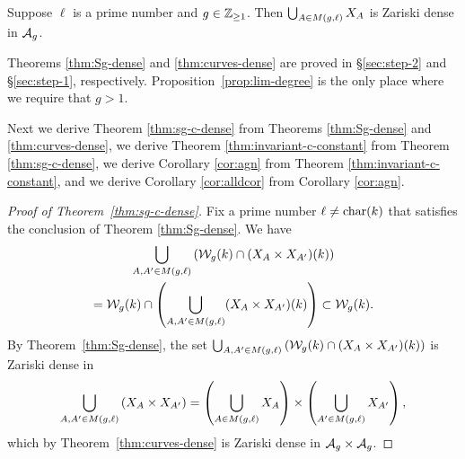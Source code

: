 \documentclass{amsart}
\begin{document}
\begin{theorem}\label{thm:curves-dense}
    Suppose $\ell$ is a prime number and $g\in\mathbb{Z}_{\ge 1}$. Then $\bigcup_{A \in M(g,\ell)} X_A$ is Zariski dense in $\mathcal{A}_g$.
\end{theorem}

Theorems \ref{thm:Sg-dense} and \ref{thm:curves-dense} are proved in \S\ref{sec:step-2} and \S\ref{sec:step-1}, respectively. Proposition~\ref{prop:lim-degree} is the only place where we require that $g > 1$.

Next we derive Theorem \ref{thm:sg-c-dense} from Theorems \ref{thm:Sg-dense} and \ref{thm:curves-dense},  we derive Theorem \ref{thm:invariant-c-constant} from Theorem \ref{thm:sg-c-dense},  we derive Corollary \ref{cor:agn} from Theorem \ref{thm:invariant-c-constant}, and we derive Corollary \ref{cor:alldcor} from Corollary \ref{cor:agn}.

\begin{proof}[Proof of Theorem~\ref{thm:sg-c-dense}]
Fix a prime number $\ell\neq\operatorname{char}(k)$ that satisfies the conclusion of Theorem \ref{thm:Sg-dense}. We have
\begin{multline*}
\bigcup_{A,A' \in M(g,\ell)} \left(\mathcal{W}_g(k) \cap (X_A \times X_{A'})(k)\right) \\
 =  \mathcal{W}_g(k) \cap \left(\bigcup_{A,A' \in M(g,\ell)} (X_A \times X_{A'})(k)\right)
   \subset \mathcal{W}_g(k).
\end{multline*}
By Theorem~\ref{thm:Sg-dense}, the set
$\bigcup_{A,A' \in M(g,\ell)} \left(\mathcal{W}_g(k) \cap (X_A \times X_{A'})(k)\right)$ is Zariski dense in
$$
\bigcup_{A,A' \in M(g,\ell)} \left(X_A \times X_{A'}\right) =
    \left(\bigcup_{A \in M(g,\ell)} X_A\right) \times \left(\bigcup_{A' \in M(g,\ell)} X_{A'}\right),
    $$
    which by Theorem~\ref{thm:curves-dense} is Zariski dense in $\mathcal{A}_g \times \mathcal{A}_g$.
\end{proof}
\end{document}
